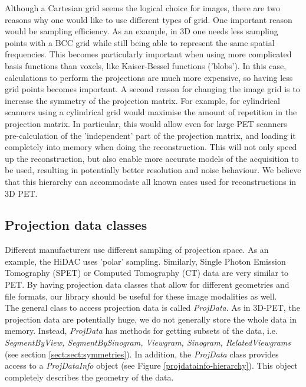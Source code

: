 \documentclass{article}
\begin{document}
Although a Cartesian grid seems the logical choice for images, 
there are two reasons why one would like to use different types 
of grid. One important reason would be sampling efficiency. As 
an example, in 3D one needs less sampling points with a BCC grid 
while still being able to represent the same spatial frequencies. 
This becomes particularly important when using more complicated 
basis functions than voxels, like Kaiser-Bessel functions ('blobs'). 
In this case, calculations to perform the projections are much 
more expensive, so having less grid points becomes important. 
A second reason for changing the image grid is to increase the 
symmetry of the projection matrix. For example, for cylindrical 
scanners using a cylindrical grid would maximise the amount of 
repetition in the projection matrix. In particular, this would 
allow even for large PET scanners pre-calculation of the 'independent' 
part of the projection matrix, and loading it completely into 
memory when doing the reconstruction. This will not only speed 
up the reconstruction, but also enable more accurate models of 
the acquisition to be used, resulting in potentially better resolution 
and noise behaviour. We believe that this hierarchy can accommodate 
all known cases used for reconstructions in 3D PET.



\subsection{
Projection data classes}

Different manufacturers use different sampling of projection 
space. As an example, the HiDAC uses 'polar' sampling. Similarly, 
Single Photon Emission Tomography (SPET) or Computed Tomography 
(CT) data are very similar to PET. By having projection data 
classes that allow for different geometries and file formats, 
our library should be useful for these image modalities as well.\\
The general class to access projection data is called \textit{ProjData}. 
As in 3D-PET, the projection data are potentially huge, we do 
not generally store the whole data in memory. Instead, \textit{ProjData} 
has methods for getting subsets of the data, i.e. \textit{SegmentByView, 
SegmentBySinogram, Viewgram, Sinogram, RelatedViewgrams} (see section 
\ref{sect:sect:symmetries}). 
In addition, the \textit{ProjData} class provides access to a \textit{ProjDataInfo} 
object (see Figure \ref{projdatainfo-hierarchy}). This object completely describes the 
geometry of the data.
\end{document}
